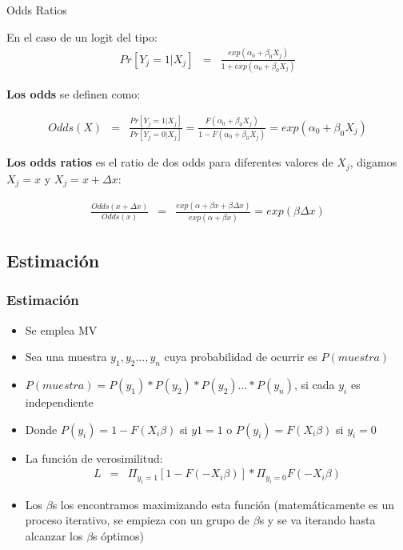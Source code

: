 \begin{frame}{Odds Ratios}
	
	En el caso de un logit del tipo:
	\begin{eqnarray}
		Pr[Y_j=1|X_j] &=& \frac{exp(\alpha_0+\beta_0 X_j)}{1+exp(\alpha_0+\beta_0 X_j)}
	\end{eqnarray}
	
	
	\textbf{Los odds} se definen como:
	
	\begin{eqnarray}
		Odds(X) &=& \frac{Pr[Y_j=1 | X_j]}{Pr[Y_j=0 | X_j]}=\frac{F(\alpha_0+\beta_0 X_j)}{1-F(\alpha_0+\beta_0
			X_j)}=exp(\alpha_0+\beta_0 X_j)
	\end{eqnarray}
	
	
	\textbf{Los odds ratios} es el ratio de dos odds para diferentes
	valores de $X_j$, digamos $X_j=x$ y $X_j=x+\Delta x$:
	
	\begin{eqnarray*}
		\frac{Odds(x+\Delta x)}{Odds(x)} &=& \frac{exp(\alpha+\beta x+\beta \Delta x)}{exp(\alpha+\beta
			x)}=exp(\beta \Delta x)
	\end{eqnarray*}
	
\end{frame}


\subsection{Estimación}

\begin{frame}[fragile]
	\frametitle{Estimación}
	\begin{itemize}
		\item Se emplea MV
		
		\item Sea una muestra $y_1, y_2..., y_n$ cuya probabilidad de
		ocurrir es $P(muestra)$
		
		\item $P(muestra)=P(y_1)*P(y_2)*P(y_2)...*P(y_n)$, si cada
		$y_i$  es independiente
		
		\item Donde $P(y_i)=1-F(X_i\beta)$  si $y1=1$  o $P(y_i)=F(X_i\beta)$  si
		$y_i=0$
		
		\item La función de verosimilitud:
		\begin{eqnarray*}
			L &=& \Pi_{y_i=1}[1-F(-X_i\beta)]*\Pi_{y_i=0}F(-X_i\beta)
		\end{eqnarray*}
		
		\item Los $\beta$s los encontramos maximizando esta función
		(matemáticamente es un proceso iterativo, se empieza con un
		grupo de $\beta$s y se va iterando hasta alcanzar los $\beta$s óptimos)
	\end{itemize}
\end{frame}

